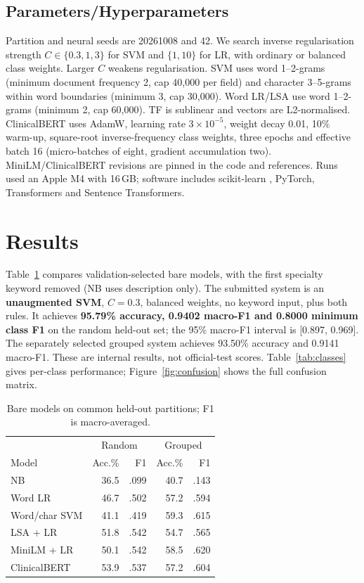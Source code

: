 \documentclass[twocolumn,10pt]{article}
\begin{document}
\subsection{Parameters/Hyperparameters}
Partition and neural seeds are 20261008 and 42. We search inverse regularisation strength $C\in\{0.3,1,3\}$ for SVM and $\{1,10\}$ for LR, with ordinary or balanced class weights. Larger $C$ weakens regularisation. SVM uses word 1--2-grams (minimum document frequency 2, cap 40,000 per field) and character 3--5-grams within word boundaries (minimum 3, cap 30,000). Word LR/LSA use word 1--2-grams (minimum 2, cap 60,000). TF is sublinear and vectors are L2-normalised. ClinicalBERT uses AdamW, learning rate $3\times10^{-5}$, weight decay 0.01, 10\% warm-up, square-root inverse-frequency class weights, three epochs and effective batch 16 (micro-batches of eight, gradient accumulation two). MiniLM/ClinicalBERT revisions are pinned in the code and references. Runs used an Apple M4 with 16\,GB; software includes scikit-learn \cite{pedregosa2011}, PyTorch, Transformers and Sentence Transformers.

\section{Results}
Table~\ref{tab:models} compares validation-selected bare models, with the first specialty keyword removed (NB uses description only). The submitted system is an \textbf{unaugmented SVM}, $C=0.3$, balanced weights, no keyword input, plus both rules. It achieves \textbf{95.79\% accuracy, 0.9402 macro-F1 and 0.8000 minimum class F1} on the random held-out set; the 95\% macro-F1 interval is [0.897, 0.969]. The separately selected grouped system achieves 93.50\% accuracy and 0.9141 macro-F1. These are internal results, not official-test scores. Table~\ref{tab:classes} gives per-class performance; Figure~\ref{fig:confusion} shows the full confusion matrix.

\begin{table}[!ht]
\centering\small
\setlength{\tabcolsep}{3pt}
\begin{tabular}{lrrrr}
\toprule
& \multicolumn{2}{c}{Random} & \multicolumn{2}{c}{Grouped}\\
Model & Acc.\% & F1 & Acc.\% & F1\\\midrule
NB &36.5&.099&40.7&.143\\
Word LR &46.7&.502&57.2&.594\\
Word/char SVM &41.1&.419&59.3&.615\\
LSA + LR &51.8&.542&54.7&.565\\
MiniLM + LR &50.1&.542&58.5&.620\\
ClinicalBERT &53.9&.537&57.2&.604\\\bottomrule
\end{tabular}
\caption{Bare models on common held-out partitions; F1 is macro-averaged.}\label{tab:models}
\end{table}
\end{document}
